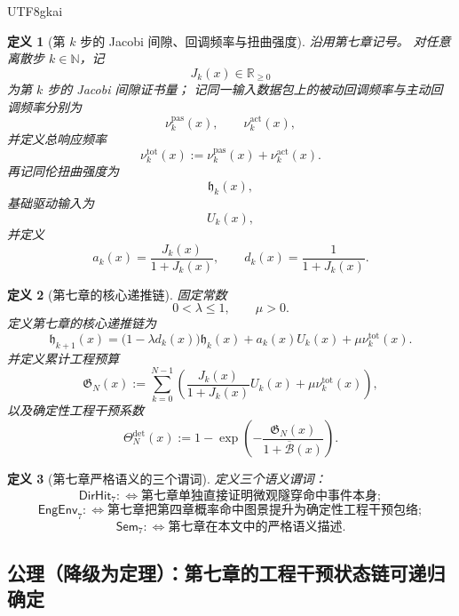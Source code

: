 \documentclass[12pt]{article}
\newtheorem{definition}{定义}[section]
\newcommand{\NN}{\mathbb{N}}
\newcommand{\RR}{\mathbb{R}}
\begin{document}
\begin{CJK*}{UTF8}{gkai}
\begin{definition}[第 $k$ 步的 Jacobi 间隙、回调频率与扭曲强度]
沿用第七章记号。
对任意离散步 $k\in\NN$，记
\[
  J_k(x)\in \RR_{\ge 0}
\]
为第 $k$ 步的 Jacobi 间隙证书量；
记同一输入数据包上的被动回调频率与主动回调频率分别为
\[
  \nu_k^{\mathrm{pas}}(x),
  \qquad
  \nu_k^{\mathrm{act}}(x),
\]
并定义总响应频率
\[
  \nu_k^{\mathrm{tot}}(x)
  :=
  \nu_k^{\mathrm{pas}}(x)+\nu_k^{\mathrm{act}}(x).
\]
再记同伦扭曲强度为
\[
  \mathfrak h_k(x),
\]
基础驱动输入为
\[
  U_k(x),
\]
并定义
\[
  a_k(x)=\frac{J_k(x)}{1+J_k(x)},
  \qquad
  d_k(x)=\frac{1}{1+J_k(x)}.
\]
\end{definition}

\begin{definition}[第七章的核心递推链]
\label{def:tex36-ch8-core-recursion}
固定常数
\[
  0<\lambda\le 1,
  \qquad
  \mu>0.
\]
定义第七章的核心递推链为
\[
  \mathfrak h_{k+1}(x)
  =
  \bigl(1-\lambda d_k(x)\bigr)\mathfrak h_k(x)
  +
  a_k(x)U_k(x)
  +
  \mu \nu_k^{\mathrm{tot}}(x).
\]
并定义累计工程预算
\[
  \mathfrak G_N(x)
  :=
  \sum_{k=0}^{N-1}
  \left(
    \frac{J_k(x)}{1+J_k(x)}U_k(x)
    +
    \mu\nu_k^{\mathrm{tot}}(x)
  \right),
\]
以及确定性工程干预系数
\[
  \Theta_N^{\mathrm{det}}(x)
  :=
  1-\exp\left(
    -\frac{\mathfrak G_N(x)}{1+\overline{\mathcal B}(x)}
  \right).
\]
\end{definition}

\begin{definition}[第七章严格语义的三个谓词]
\label{def:tex36-ch8-semantics}
定义三个语义谓词：
\[
  \mathsf{DirHit}_7
  :
  \Longleftrightarrow
  \text{第七章单独直接证明微观隧穿命中事件本身};
\]
\[
  \mathsf{EngEnv}_7
  :
  \Longleftrightarrow
  \text{第七章把第四章概率命中图景提升为确定性工程干预包络};
\]
\[
  \mathsf{Sem}_7
  :
  \Longleftrightarrow
  \text{第七章在本文中的严格语义描述}.
\]
\end{definition}

\subsection{公理（降级为定理）：第七章的工程干预状态链可递归确定}
\label{subsec:tex36-ch8-axiom}


\end{CJK*}
\end{document}
